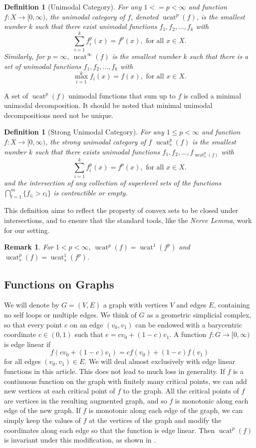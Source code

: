 \documentclass[11pt]{article}
\DeclareMathOperator{\ucat}{ucat}
\newtheorem{dfn}[thm]{Definition}
\newtheorem{rem}[thm]{Remark}
\begin{document}
\begin{dfn}[Unimodal Category]
For any $1 <= p < \infty$ and function $f : X \rightarrow [0, \infty)$, the unimodal category of $f$, denoted  $\ucat^p(f)$, is the smallest number $k$ such that there exist unimodal functions $f_1, f_2, \ldots, f_{k}$ with
\[
	\sum_{i=1}^{k} f_i^p(x) = f^p(x),\mbox{ for all } x \in X.
\] 
Similarly, for $p = \infty$, $\ucat^{\infty}(f)$ is the smallest number $k$ such that there is a set of unimodal functions $f_1, f_2, \ldots, f_{k}$ with
\[
	\max_{i=1}^{k} f_i(x) = f(x),\mbox{ for all }x \in X.
\]
\end{dfn}

A set of $\ucat^p(f)$ unimodal functions that sum up to $f$ is called a minimal unimodal decomposition. It should be noted that minimal unimodal decompositions need not be unique. 

\begin{dfn}[Strong Unimodal Category]
For any $1\leq p < \infty$ and function $f : X \rightarrow [0, \infty)$, the strong unimodal category of $f$ $\ucat_s^p(f)$ is the smallest number $k$ such that there exists unimodal functions $f_1, f_2, \ldots, f_{\ucat_s^p(f)}$ with
\[
	\sum_{i=1}^{k} f_i^p(x) = f^p(x),\mbox{ for all } x \in X.
\] 
and the intersection of any collection of superlevel sets of the functions $\bigcap\limits_{l=1}^{m} \{f_{i_l} > c_l\}$
is contractible or empty.
\end{dfn}
This definition aims to reflect the property of convex sets to be closed under intersections, and to ensure that the standard tools, like the {\em Nerve Lemma}, work for our setting.

\begin{rem}
For $1 < p < \infty$, $\ucat^p(f) = \ucat^1(f^p)$ and $\ucat_s^p(f) = \ucat_s^1(f^p)$.
\end{rem}

\subsection{Functions on Graphs}
We will denote by $G=(V,E)$ a graph with vertices $V$ and edges $E$, containing no self loops or multiple edges. We think of $G$ as a geometric simplicial complex, so that every point $e$ on an edge $(v_0, v_1)$  can be
endowed with a barycentric coordinate $c \in (0,1)$ such that $e = cv_0 + (1-c)v_1$. A function $f : G \rightarrow [0,\infty)$ is edge linear if 
\[
f(cv_0 + (1-c)v_1) = cf(v_0) + (1-c)f(v_1)
\]
 for all edges $(v_0,v_1) \in E$. We will deal almost exclusively with edge linear functions in this article. This does not lead to much loss in generality. If $f$ is a continuous function on the graph with finitely many critical points, we can add new vertices at each critical point of $f$ to the graph. All the critical points of $f$ are vertices in the resulting augmented graph, and so $f$ is monotonic along each edge of the new graph. If $f$ is monotonic along each edge of the graph, we can simply keep the values of $f$ at the vertices of the graph and modify the coordinates along each edge so that the function is edge linear. Then $\ucat^p(f)$ is invariant under this modification, as shown in \cite{Bar20}.
\end{document}
